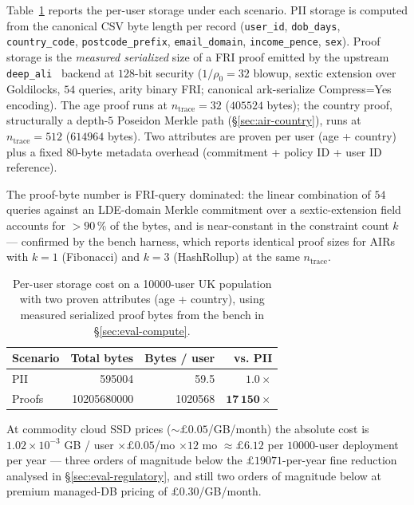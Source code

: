 \documentclass[11pt,a4paper]{article}
\begin{document}
Table~\ref{tab:storage} reports the per\nobreakdash-user storage
under each scenario.  PII storage is computed from the canonical
CSV byte length per record (\texttt{user\_id}, \texttt{dob\_days},
\texttt{country\_code}, \texttt{postcode\_prefix},
\texttt{email\_domain}, \texttt{income\_pence}, \texttt{sex}).
Proof storage is the \emph{measured serialized} size of a FRI
proof emitted by the upstream \texttt{deep\_ali}~\cite{stark-stir}
backend at $128$\nobreakdash-bit security
($1/\rho_0 = 32$ blowup, sextic extension over Goldilocks,
$54$ queries, arity binary FRI; canonical
ark\nobreakdash-serialize Compress=Yes encoding).  The age proof
runs at $n_\mathrm{trace} = 32$ ($\num{405524}$ bytes); the
country proof, structurally a depth\nobreakdash-$5$ Poseidon Merkle
path (\S\ref{sec:air-country}), runs at $n_\mathrm{trace} = 512$
($\num{614964}$ bytes).  Two attributes are proven per user (age
+ country) plus a fixed $80$\nobreakdash-byte metadata overhead
(commitment + policy ID + user ID reference).

The proof\nobreakdash-byte number is FRI\nobreakdash-query
dominated: the linear combination of $54$ queries against an
LDE\nobreakdash-domain Merkle commitment over a sextic\nobreakdash-extension
field accounts for $> 90\,\%$ of the bytes, and is
near\nobreakdash-constant in the constraint count
$k$ — confirmed by the bench harness, which reports identical
proof sizes for AIRs with $k = 1$ (Fibonacci) and $k = 3$
(HashRollup) at the same $n_\mathrm{trace}$.

\begin{table}[h]
  \centering
  \caption{Per\nobreakdash-user storage cost on a
    \num{10000}\nobreakdash-user UK population with two proven
    attributes (age + country), using measured serialized proof
    bytes from the bench in \S\ref{sec:eval-compute}.}
  \label{tab:storage}
  \begin{tabular}{l r r r}
    \toprule
    \textbf{Scenario} & \textbf{Total bytes} & \textbf{Bytes / user} & \textbf{vs. PII} \\
    \midrule
    PII   &      \num{595004}     &       \num{59.5}    & $1.0\times$ \\
    Proofs & \num{10205680000} & \num{1020568}      & $\mathbf{17\,150\times}$ \\
    \bottomrule
  \end{tabular}
\end{table}

At commodity cloud SSD prices ($\sim\!\pounds 0.05$/GB/month) the
absolute cost is
$1.02 \times 10^{-3}$ GB / user $\times \pounds 0.05$/mo
$\times 12$ mo $\approx \pounds 6.12$ per $\num{10000}$\nobreakdash-user
deployment per year — three orders of magnitude below the
$\pounds\num{19071}$\nobreakdash-per\nobreakdash-year fine
reduction analysed in \S\ref{sec:eval-regulatory}, and still
two orders of magnitude below at premium managed\nobreakdash-DB
pricing of $\pounds 0.30$/GB/month.
\end{document}

